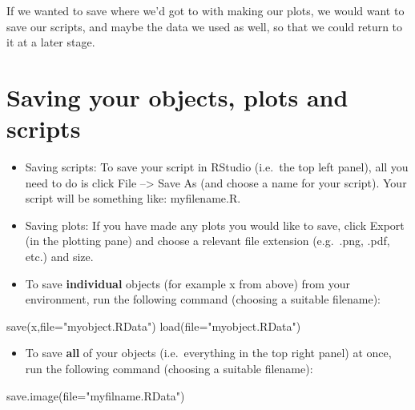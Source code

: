 \documentclass[
  letterpaper,
  DIV=11,
  numbers=noendperiod]{scrreprt}
\newenvironment{Shaded}{\begin{snugshade}}{\end{snugshade}}
\newcommand{\AttributeTok}[1]{\textcolor[rgb]{0.40,0.45,0.13}{#1}}
\newcommand{\FunctionTok}[1]{\textcolor[rgb]{0.28,0.35,0.67}{#1}}
\newcommand{\NormalTok}[1]{\textcolor[rgb]{0.00,0.23,0.31}{#1}}
\newcommand{\StringTok}[1]{\textcolor[rgb]{0.13,0.47,0.30}{#1}}
\providecommand{\tightlist}{%
  \setlength{\itemsep}{0pt}\setlength{\parskip}{0pt}}\usepackage{longtable,booktabs,array}
\begin{document}
If we wanted to save where we'd got to with making our plots, we would
want to save our scripts, and maybe the data we used as well, so that we
could return to it at a later stage.

\hypertarget{saving-your-objects-plots-and-scripts}{%
\section*{Saving your objects, plots and
scripts}\label{saving-your-objects-plots-and-scripts}}

\begin{itemize}
\item
  Saving scripts: To save your script in RStudio (i.e.~the top left
  panel), all you need to do is click File --\textgreater{} Save As (and
  choose a name for your script). Your script will be something like:
  myfilename.R.
\item
  Saving plots: If you have made any plots you would like to save, click
  Export (in the plotting pane) and choose a relevant file extension
  (e.g.~.png, .pdf, etc.) and size.
\item
  To save \textbf{individual} objects (for example x from above) from
  your environment, run the following command (choosing a suitable
  filename):
\end{itemize}

\begin{Shaded}
\begin{Highlighting}[]
\FunctionTok{save}\NormalTok{(x,}\AttributeTok{file=}\StringTok{"myobject.RData"}\NormalTok{)}
\FunctionTok{load}\NormalTok{(}\AttributeTok{file=}\StringTok{"myobject.RData"}\NormalTok{)}
\end{Highlighting}
\end{Shaded}

\begin{itemize}
\tightlist
\item
  To save \textbf{all} of your objects (i.e.~everything in the top right
  panel) at once, run the following command (choosing a suitable
  filename):
\end{itemize}

\begin{Shaded}
\begin{Highlighting}[]
\FunctionTok{save.image}\NormalTok{(}\AttributeTok{file=}\StringTok{"myfilname.RData"}\NormalTok{)}
\end{Highlighting}
\end{Shaded}
\end{document}
